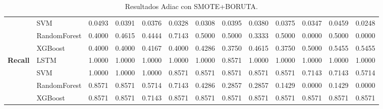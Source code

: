 \begin{table}[H]
\begin{adjustbox}{max width=14cm}
\begin{tabular}{|c|l|r|r|r|r|r|r|r|r|r|r|r|}
			& SVM &  0.0493 &  0.0391 &  0.0376 &  0.0328 &  0.0308 &  0.0395 &  0.0380 &  0.0375 &  0.0347 &  0.0459 &  0.0248 \\
			& RandomForest &  0.4000 &  0.4615 &  0.4444 &  0.7143 &  0.5000 &  0.5000 &  0.3333 &  0.5000 &  0.0000 &  0.5000 &  0.0000 \\
			& XGBoost &  0.4000 &  0.4000 &  0.4167 &  0.4000 &  0.4286 &  0.3750 &  0.4615 &  0.3750 &  0.5000 &  0.5455 &  0.5455 \\
			\hline
			\textbf{Recall} & LSTM &  1.0000 &  1.0000 &  1.0000 &  1.0000 &  1.0000 &  0.8571 &  1.0000 &  1.0000 &  1.0000 &  1.0000 &  1.0000 \\
			& SVM &  1.0000 &  1.0000 &  1.0000 &  0.8571 &  0.8571 &  0.8571 &  0.8571 &  0.8571 &  0.7143 &  0.7143 &  0.5714 \\
			& RandomForest &  0.8571 &  0.8571 &  0.5714 &  0.7143 &  0.4286 &  0.2857 &  0.2857 &  0.1429 &  0.0000 &  0.1429 &  0.0000 \\
			& XGBoost &  0.8571 &  0.8571 &  0.7143 &  0.8571 &  0.8571 &  0.8571 &  0.8571 &  0.8571 &  0.8571 &  0.8571 &  0.8571 \\
			\hline
		\end{tabular}
	\end{adjustbox}
	\caption{Resultados Adiac con SMOTE+BORUTA.}
	\label{tab:Adiac_SMOTE_BORUTA}
\end{table}


